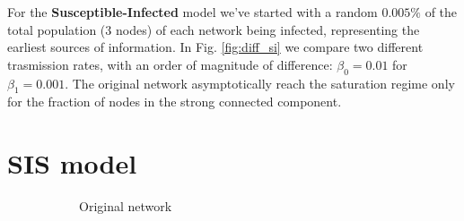     For the \textbf{Susceptible-Infected} model we've started with a random $0.005\%$ of the total population ($3$ nodes)
    of each network being infected, representing the earliest sources of information.
    In Fig. \ref{fig:diff_si} we compare two different trasmission rates, with an order of magnitude of difference:
    $ \beta_0 =0.01$ for   $\beta_1 = 0.001$. The original network asymptotically reach the saturation regime only for the fraction of nodes
    in the strong connected component.



\section{SIS model} %
\label{sec:sis_model}
    \begin{figure}[H]
        \centering
        \begin{subfigure}{0.3\textwidth}
            \caption{Original network}
            \label{diff_sis}
        \end{subfigure}
        \begin{subfigure}{0.3\textwidth}
\end{subfigure}
\end{figure}
